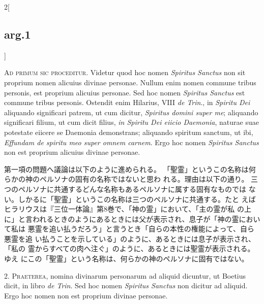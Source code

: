 \documentclass[paper=a4paper,fontsize=10pt,jafontsize=9pt,titlepage]{jlreq}
\begin{document}
{}
\setcounter{section}{1}
\setcounter{subsection}{0}

\begin{paracol}{2}[\subsection{arg.1}]

{\scshape Ad primum sic proceditur}. Videtur quod hoc nomen {\itshape Spiritus Sanctus} non
sit proprium nomen alicuius divinae personae. Nullum enim nomen
commune tribus personis, est proprium alicuius personae. Sed hoc nomen
{\itshape Spiritus Sanctus} est commune tribus personis. Ostendit enim Hilarius,
VIII {\itshape de Trin}., in {\itshape Spiritu Dei} aliquando significari patrem, ut cum
dicitur, {\itshape Spiritus domini super me}; aliquando significari filium, ut
cum dicit filius, {\itshape in Spiritu Dei eiicio Daemonia}, naturae suae
potestate eiicere se Daemonia demonstrans; aliquando spiritum sanctum,
ut ibi, {\itshape Effundam de spiritu meo super omnem carnem}. Ergo hoc nomen
{\itshape Spiritus Sanctus} non est proprium alicuius divinae personae.

\switchcolumn

第一項の問題へ議論は以下のように進められる。
「聖霊」というこの名称は何らかの神のペルソナの固有の名称ではないと思わ
 れる。理由は以下の通り。
三つのペルソナに共通するどんな名称もあるペルソナに属する固有なものでは
 ない。しかるに「聖霊」というこの名称は三つのペルソナに共通する。たと
 えばヒラリウスは『三位一体論』第8巻で、「神の霊」において、「主の霊が私
 の上に」と言われるときのようにあるときには父が表示され、息子が「神の霊において私は
 悪霊を追い払うだろう」と言うとき「自らの本性の権能によって、自ら悪霊を追
 い払うことを示している」のように、あるときには息子が表示され、「私の
 霊からすべての肉へ注ぐ」のように、あるときには聖霊が表示される。ゆえ
 にこの「聖霊」という名称は、何らかの神のペルソナに固有ではない。


2. {\scshape Praeterea}, nomina divinarum personarum ad aliquid dicuntur, ut Boetius
dicit, in libro {\itshape de Trin}. Sed hoc nomen {\itshape Spiritus Sanctus} non dicitur ad
aliquid. Ergo hoc nomen non est proprium divinae personae.


\end{paracol}
\end{document}
